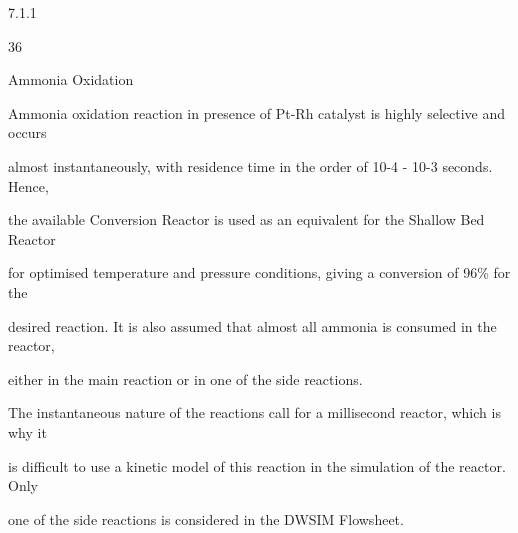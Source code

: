 \documentclass[a4paper,portrait,12pt]{article}
\begin{document}
7.1.1





36





\begin{flushleft}
Ammonia Oxidation
\end{flushleft}





\begin{flushleft}
Ammonia oxidation reaction in presence of Pt-Rh catalyst is highly selective and occurs
\end{flushleft}


\begin{flushleft}
almost instantaneously, with residence time in the order of 10-4 - 10-3 seconds. Hence,
\end{flushleft}


\begin{flushleft}
the available Conversion Reactor is used as an equivalent for the Shallow Bed Reactor
\end{flushleft}


\begin{flushleft}
for optimised temperature and pressure conditions, giving a conversion of 96\% for the
\end{flushleft}


\begin{flushleft}
desired reaction. It is also assumed that almost all ammonia is consumed in the reactor,
\end{flushleft}


\begin{flushleft}
either in the main reaction or in one of the side reactions.
\end{flushleft}


\begin{flushleft}
The instantaneous nature of the reactions call for a millisecond reactor, which is why it
\end{flushleft}


\begin{flushleft}
is difficult to use a kinetic model of this reaction in the simulation of the reactor. Only
\end{flushleft}


\begin{flushleft}
one of the side reactions is considered in the DWSIM Flowsheet.
\end{flushleft}
\end{document}
